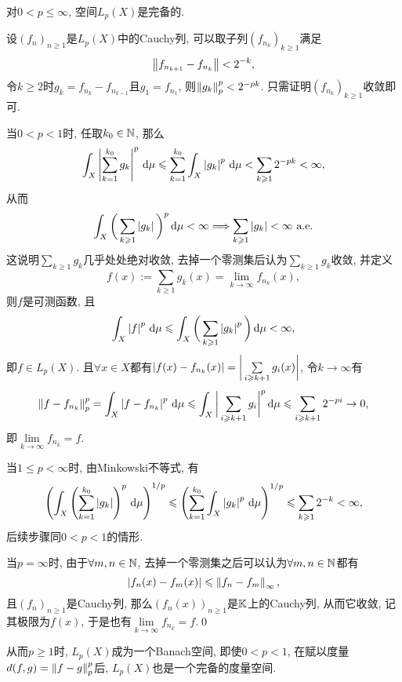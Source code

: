     \begin{Theorem}
    对$ 0<p\leqslant\infty $, 空间$ L_p(X) $是完备的.
    \end{Theorem}
    \begin{Proof}
    设$ (f_n)_{n\geqslant 1} $是$ L_p(X) $中的Cauchy列, 可以取子列$ (f_{n_k})_{k\geqslant 1} $满足
    \[
    \left\| f_{n_{k+1}}-f_{n_k} \right\|<2^{-k},
    \]
    令$ k\geqslant 2 $时$ g_k=f_{n_k}-f_{n_{k-1}} $且$ g_1=f_{n_1} $, 则$ \left\| g_k \right\|_p^p<2^{-pk} $. 只需证明$ (f_{n_k})_{k\geqslant 1} $收敛即可.

    当$ 0<p<1 $时, 任取$ k_0\in\mathbb{N} $, 那么
    \[
    \int_X\left| \sum_{k=1}^{k_0}g_k \right| ^p\,\mathrm{d}\mu\leqslant\sum_{k=1}^{k_0}\int_X\left| g_k \right| ^p\,\mathrm{d}\mu<\sum_{k\geqslant 1}2^{-pk}<\infty,
    \]
    从而
    \[
    \int_X\bigg(\sum_{k\geqslant 1}\left| g_k \right| \bigg)^p\,\mathrm{d}\mu<\infty\Longrightarrow\sum_{k\geqslant 1}\left| g_k \right| <\infty\ \text{a.e.}
    \]
    这说明$ \sum\limits_{k\geqslant 1}g_k $几乎处处绝对收敛, 去掉一个零测集后认为$ \sum\limits_{k\geqslant 1}g_{k} $收敛, 并定义
    \[
    f(x):=\sum_{k\geqslant 1}g_k(x)=\lim_{k\to\infty}f_{n_k}(x),
    \]
    则$ f $是可测函数, 且
    \[
    \int_X\left| f \right| ^p\,\mathrm{d}\mu\leqslant\int_X\bigg(\sum_{k\geqslant 1}\left| g_k \right| ^p\bigg)\,\mathrm{d} \mu<\infty,
    \]
    即$ f\in L_p(X) $. 且$ \forall x\in X $都有$ \left| f(x)-f_{n_k}(x) \right| =\bigg|\sum\limits_{i\geqslant k+1}g_i(x)\bigg| $, 令$ k\to\infty $有
    \[
    \left\| f-f_{n_k} \right\|_p^p=\int_X\left| f-f_{n_k} \right| ^p\,\mathrm{d}\mu\leqslant\int_X\bigg|\sum_{i\geqslant k+1}g_i\bigg|^p\,\mathrm{d}\mu\leqslant\sum_{i\geqslant k+1}2^{-pi}\to 0,
    \]
    即$ \lim\limits_{k\to\infty}f_{n_{k}}=f $.

    当$ 1\leqslant p<\infty $时, 由Minkowski不等式, 有
    \[
    \left( \int_X\left( \sum_{k=1}^{k_0}\left| g_k \right|  \right)^p\,\mathrm{d}\mu \right)^{1/p}\leqslant\left( \sum_{k=1}^{k_0}\int_X\left| g_k \right| ^p\,\mathrm{d}\mu \right)^{1/p}\leqslant\sum_{k\geqslant 1}2^{-k}<\infty,
    \]
    后续步骤同$ 0<p<1 $的情形.

    当$ p=\infty $时, 由于$ \forall m,n\in\mathbb{N} $, 去掉一个零测集之后可以认为$ \forall m,n\in\mathbb{N} $都有
    \[
    \left| f_n(x)-f_m(x) \right| \leqslant\left\| f_n-f_m \right\|_\infty,
    \]
    且$ (f_n)_{n\geqslant 1} $是Cauchy列, 那么$ (f_n(x))_{n\geqslant 1} $是$ \mathbb{K} $上的Cauchy列, 从而它收敛, 记其极限为$ f(x) $, 于是也有$ \lim\limits_{k\to\infty}f_{n_k}=f $.\qed
    \end{Proof}

    从而$ p\geqslant 1 $时, $ L_p(X) $成为一个Banach空间, 即使$ 0<p<1 $, 在赋以度量$ d(f,g)=\left\| f-g \right\|_p^p $后, $ L_p(X) $也是一个完备的度量空间.

